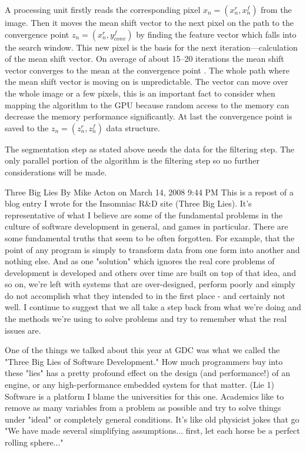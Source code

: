 A processing unit firstly reads the corresponding pixel $x_n = (x_n^r, x_n^f)$
from the image. Then it moves the mean shift vector to the next pixel on the
path to the convergence point $z_n = (x_n^r, y_{conv}^f)$ by finding the feature
vector which falls into the search window. This new pixel is the basis for the
next iteration---calculation of the mean shift vector. On average of about
15--20 iterations the mean shift vector converges to the mean at the convergence
point \citep{DBLP:conf/eccv/ZhangKT06}. The whole path where the mean shift
vector is moving on is unpredictable. The vector can move over the whole image
or a few pixels, this is an important fact to consider when mapping the
algorithm to the \gls{GPU} because random access to the memory can decrease the
memory performance significantly. At last the convergence point is saved to the
$z_n = (z_n^r, z_n^f)$ data structure.

The segmentation step as stated above needs the data for the filtering step. The
only parallel portion of the algorithm is the filtering step so no further 
considerations will be made. 






Three Big Lies By Mike Acton on March 14, 2008 9:44 PM This is a repost of a
blog entry I wrote for the Insomniac R\&D site (Three Big Lies). It's
representative of what I believe are some of the fundamental problems in the
culture of software development in general, and games in particular. There are
some fundamental truths that seem to be often forgotten. For example, that the
point of any program is simply to transform data from one form into another and
nothing else. And as one "solution" which ignores the real core problems of
development is developed and others over time are built on top of that idea, and
so on, we're left with systems that are over-designed, perform poorly and simply
do not accomplish what they intended to in the first place - and certainly not
well. I continue to suggest that we all take a step back from what we're doing
and the methods we're using to solve problems and try to remember what the real
issues are.

One of the things we talked about this year at GDC was what we called the "Three
Big Lies of Software Development." How much programmers buy into these "lies"
has a pretty profound effect on the design (and performance!) of an engine, or
any high-performance embedded system for that matter. (Lie 1) Software is a
platform I blame the universities for this one. Academics like to remove as many
variables from a problem as possible and try to solve things under "ideal" or
completely general conditions. It's like old physicist jokes that go "We have
made several simplifying assumptions... first, let each horse be a perfect
rolling sphere..."

